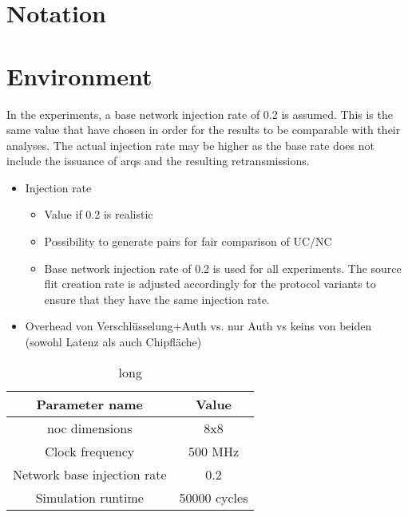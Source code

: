 \section{Notation}

\section{Environment}
In the experiments, a base network injection rate of 0.2 is assumed. This is the same value that \citeauthor{moriam18activeattackers} have chosen
\cite[2]{moriam18activeattackers} in order for the results to be comparable with their analyses. The actual injection rate may be higher as the base rate does not include the
issuance of \glspl{arq} and the resulting retransmissions.
\begin{itemize}
    \item Injection rate
        \begin{itemize}
            \item Value if 0.2 is realistic
            \item Possibility to generate pairs for fair comparison of UC/NC
            \item Base network injection rate of 0.2 is used for all experiments. The source flit creation rate is adjusted accordingly for the
                protocol variants to ensure that they have the same injection rate.
        \end{itemize}
    \item Overhead von Verschlüsselung+Auth vs. nur Auth vs keins von beiden (sowohl Latenz als auch Chipfläche)
\end{itemize}

\begin{table}
    \centering
    \begin{tabulary}{\textwidth}{C|C}
        Parameter name & Value \\\hline
        \Gls{noc} dimensions & 8x8 \\
        Clock frequency & 500 MHz \\
        Network base injection rate & 0.2 \\
        Simulation runtime & \num{50000} cycles \\
    \end{tabulary}
    \caption[short]{long}
    \label{tab:fixedparams}
\end{table}

